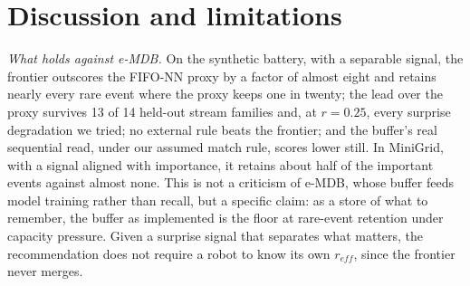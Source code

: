 \documentclass[conference]{IEEEtran}
\begin{document}
\section{Discussion and limitations}
\label{sec:discussion}

\emph{What holds against e-MDB.} On the synthetic battery, with a separable
signal, the frontier outscores the FIFO-NN proxy by a factor of almost eight
and retains nearly every rare event where the proxy keeps one in twenty; the
lead over the proxy survives 13 of 14 held-out stream families and, at
$r=0.25$, every surprise degradation we tried; no external rule beats the
frontier; and the buffer's real sequential read, under our assumed match rule,
scores lower still. In MiniGrid,
with a signal aligned with importance, it retains about half of the important
events against almost none. This is not a criticism of e-MDB, whose buffer
feeds model training rather than recall, but a specific claim: as a store of
what to remember, the buffer as implemented is the floor at rare-event
retention under capacity pressure. Given a surprise signal that separates what
matters, the recommendation does not require a robot to know its own
$r_{eff}$, since the frontier never merges.
\end{document}
